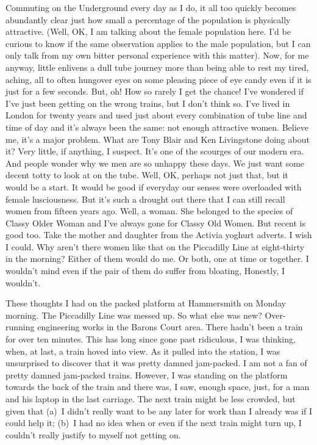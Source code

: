 
\twelverm
Commuting on the Underground every day as I do, it all too quickly
becomes abundantly clear just how small a percentage of the
population is physically attractive. (Well, OK, I am talking about
the female population here. I'd be curious to know if the same
observation applies to the male population, but I can only talk from my
own bitter personal experience with this matter). Now, for me
anyway, little enlivens a dull tube journey more than being able to
rest my tired, aching, all to often hungover eyes on some pleasing
piece of eye candy even if it is just for a few seconds. But, oh!
How so rarely I get the chance! I've wondered if I've just been getting on the wrong trains,
but I don't think so. I've lived in London for twenty years and used
just about every combination of tube line and time of day and it's
always been the same: not enough attractive women. Believe me, it's
a major problem. What are Tony Blair and Ken Livingstone doing about
it? Very little, if anything, I suspect. It's one of the scourges of
our modern era. And people wonder why we men are so unhappy these
days. We just want some decent totty to look at on the tube. Well,
OK, perhaps not {\twelveit just\/} that, but it would be a start. It would be good if
everyday our senses were overloaded with female lusciousness.
But it's such a drought out there that I can still recall women
from fifteen years ago. Well, {\twelveit a\/} woman. She belonged to
the species of Classy Older Woman and I've always gone for Classy
Old Women. But recent is good too. Take the mother and daughter from
the Activia yoghurt adverts. I wish I could. Why aren't there women
like that on the Piccadilly Line at eight-thirty in the morning?
Either of them would do me. Or both, one at time or together. I
wouldn't mind even if the pair of them do suffer from bloating,
Honestly, I wouldn't.

These thoughts I had on the packed platform at Hammersmith on Monday
morning. The Piccadilly Line was messed up. So what else was new?
Over-running engineering works in the Barons Court area. There
hadn't been a train for over ten minutes. This has long since gone
past ridiculous, I was thinking, when, at last, a train hoved into
view. As it pulled into the station, I was unsurprised to discover
that it was pretty damned jam-packed. I am not a fan of pretty damned
jam-packed trains. However, I was standing on the platform towards the
back of the train and there was, I saw, enough space, just, for a
man and his laptop in the last carriage. The next train might be
less crowded, but given that (a)~I didn't really want to be any
later for work than I already was if I could help it; (b)~I had no
idea when or even if the next train might turn up, I couldn't really
justify to myself not getting on.

